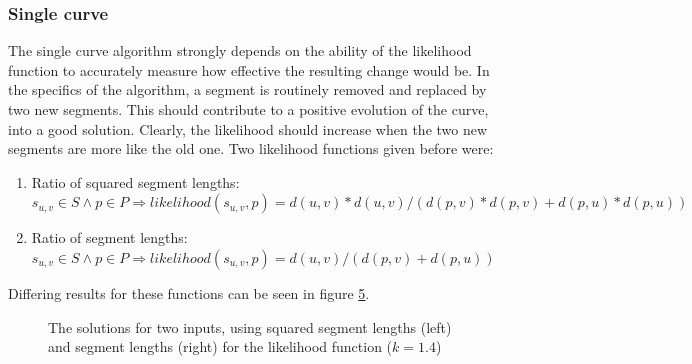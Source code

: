 \documentclass[11pt]{article}
\begin{document}
\subsubsection{Single curve}
The single curve algorithm strongly depends on the ability of the likelihood function to accurately measure how effective the resulting change would be. In the specifics of the algorithm, a segment is routinely removed and replaced by two new segments. This should contribute to a positive evolution of the curve, into a good solution. Clearly, the likelihood should increase when the two new segments are more like the old one. Two likelihood functions given before were:

\noindent
\begin{enumerate}
\topsep=0pt
\itemsep=0pt
\parsep=0pt
\item Ratio of squared segment lengths:\\
$s_{u,v} \in S \wedge p \in P \Rightarrow likelihood(s_{u,v}, p) = d(u, v)*d(u, v)/(d(p, v)*d(p, v)+d(p, u)*d(p, u))$
\item Ratio of segment lengths:\\
$s_{u,v} \in S \wedge p \in P \Rightarrow likelihood(s_{u,v}, p) = d(u, v)/(d(p, v)+d(p, u))$
\end{enumerate}

Differing results for these functions can be seen in figure \ref{fig:exp:single_parameter_a}.

\begingroup
{}%
\begin{figure}[ht!]
\centering
\begin{subfigure}{.24\linewidth}
\centering

\label{fig:exp:single_parameter_a:first}
\end{subfigure}%
\begin{subfigure}{.24\linewidth}
\centering

\label{fig:exp:single_parameter_a:second}
\centering
\end{subfigure}
\begin{subfigure}{.24\linewidth}
\centering

\label{fig:exp:single_parameter_a:third}
\end{subfigure}%
\begin{subfigure}{.24\linewidth}
\centering

\label{fig:exp:single_parameter_a:fourth}
\centering
\end{subfigure}
\caption{The solutions for two inputs, using squared segment lengths (left) and segment lengths (right) for the likelihood function ($k = 1.4$)}
\label{fig:exp:single_parameter_a}
\end{figure}
\endgroup
\end{document}
